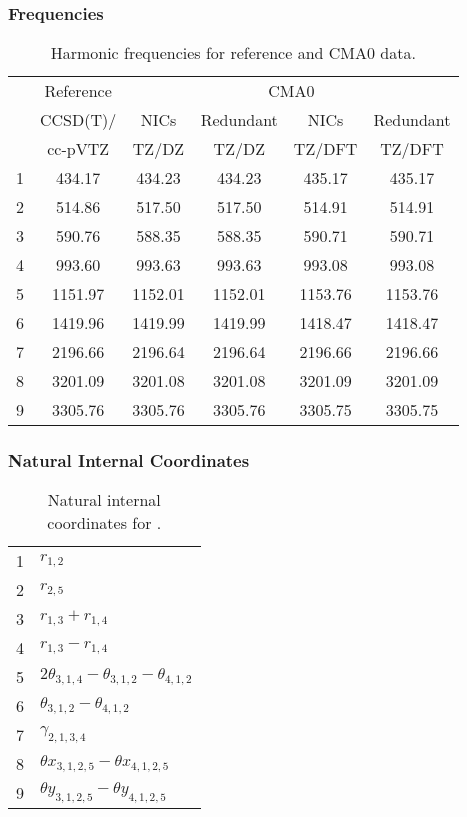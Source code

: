 \documentclass[10pt,oneside]{article}
\begin{document}
\begin{table}[h!]
\subsubsection*{Frequencies}
\centering
\caption{Harmonic frequencies for reference and CMA0 data.}
\begin{tabular}{cccccc}
\toprule
{} & Reference & \multicolumn{4}{c}{CMA0} \\
{} &  CCSD(T)/ &    NICs &  Redundant &    NICs & Redundant \\
{} &   cc-pVTZ &   TZ/DZ &      TZ/DZ &  TZ/DFT &    TZ/DFT \\
\midrule
1 &    434.17 &  434.23 &     434.23 &  435.17 &    435.17 \\
2 &    514.86 &  517.50 &     517.50 &  514.91 &    514.91 \\
3 &    590.76 &  588.35 &     588.35 &  590.71 &    590.71 \\
4 &    993.60 &  993.63 &     993.63 &  993.08 &    993.08 \\
5 &   1151.97 & 1152.01 &    1152.01 & 1153.76 &   1153.76 \\
6 &   1419.96 & 1419.99 &    1419.99 & 1418.47 &   1418.47 \\
7 &   2196.66 & 2196.64 &    2196.64 & 2196.66 &   2196.66 \\
8 &   3201.09 & 3201.08 &    3201.08 & 3201.09 &   3201.09 \\
9 &   3305.76 & 3305.76 &    3305.76 & 3305.75 &   3305.75 \\
\bottomrule
\end{tabular}
\end{table}

\begin{table}[h!]
\subsubsection*{Natural Internal Coordinates}
\centering
\caption{Natural internal coordinates for .}
\small
\begin{tabular}{ll}
\toprule
  1   & $r_{1,2}$ \\
  2   & $r_{2,5}$ \\
  3   & $r_{1,3} + r_{1,4}$ \\
  4   & $r_{1,3} - r_{1,4}$ \\
  5   & $2\theta_{3,1,4} - \theta_{3,1,2} - \theta_{4,1,2}$ \\
  6   & $\theta_{3,1,2} - \theta_{4,1,2}$ \\
  7   & $\gamma_{2,1,3,4}$ \\
  8   & $\theta x_{3,1,2,5} - \theta x_{4,1,2,5}$ \\
  9   & $\theta y_{3,1,2,5} - \theta y_{4,1,2,5}$ \\
\bottomrule
\end{tabular}
\end{table}
\end{document}
